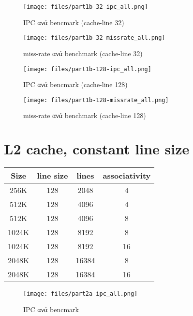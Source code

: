\documentclass[a4paper,9pt]{article}
\begin{document}
\begin{figure}[H]
    \centering
    \texttt{[image: files/part1b-32-ipc\_all.png]}
    \caption{IPC ανά bencmark (cache-line 32)}
\end{figure}

\begin{figure}[H]
    \centering
    \texttt{[image: files/part1b-32-missrate\_all.png]}
    \caption{miss-rate ανά benchmark (cache-line 32)}
\end{figure}

\begin{figure}[H]
    \centering
    \texttt{[image: files/part1b-128-ipc\_all.png]}
    \caption{IPC ανά bencmark (cache-line 128)}
\end{figure}

\begin{figure}[H]
    \centering
    \texttt{[image: files/part1b-128-missrate\_all.png]}
    \caption{miss-rate ανά benchmark (cache-line 128)}
\end{figure}


\pagebreak


\section{L2 cache, constant line size}
\begin{tabular}{c c c c}
    Size & line size & lines & associativity\\ 
    \hline
    \hline
    256K   & 128 & 2048  & 4\\
    \hline
    512K   & 128 & 4096  & 4\\
    512K   & 128 & 4096  & 8\\
    \hline
    1024K  & 128 & 8192  & 8\\
    1024K  & 128 & 8192  & 16\\
    \hline
    2048K  & 128 & 16384 & 8\\
    2048K  & 128 & 16384 & 16\\
\end{tabular}

\begin{figure}[H]
    \centering
    \texttt{[image: files/part2a-ipc\_all.png]}
    \caption{IPC ανά bencmark}
\end{figure}
\end{document}
